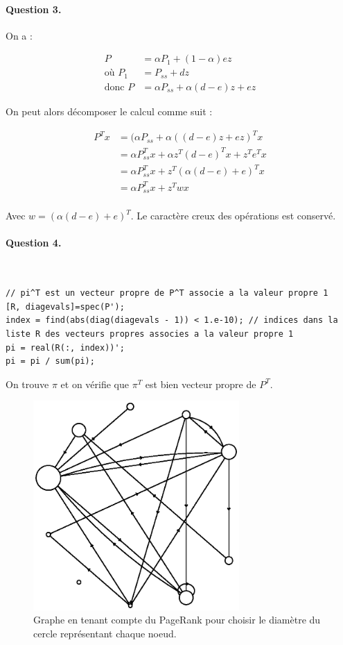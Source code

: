 \documentclass[12pt,a4paper]{article}
\begin{document}
\paragraph*{Question 3.} On a :

\begin{align*}
	P &= \alpha P_1 + (1 - \alpha) e z \\
	\text{o\`u } P_1 &= P_{ss} + dz \\
	\text{donc } P &= \alpha P_{ss} + \alpha (d - e) z + e z
\end{align*}

On peut alors décomposer le calcul comme suit :

\begin{align*}
P^T x
&= (\alpha P_{ss} + \alpha ((d - e) z + ez)^T x \\
&= \alpha P_{ss}^T x + \alpha z^T (d - e)^T x + z^T e^T x \\
&= \alpha P_{ss}^T x + z^T (\alpha (d - e) + e)^T x \\
&= \alpha P_{ss}^T x + z^T w x \\
\end{align*}

Avec $w = (\alpha (d - e) + e)^T$. Le caractère creux des opérations est conservé.

\paragraph*{Question 4.}
~
\begin{lstlisting}
// pi^T est un vecteur propre de P^T associe a la valeur propre 1
[R, diagevals]=spec(P');
index = find(abs(diag(diagevals - 1)) < 1.e-10); // indices dans la liste R des vecteurs propres associes a la valeur propre 1
pi = real(R(:, index))';
pi = pi / sum(pi);
\end{lstlisting}

On trouve $\pi$ et on vérifie que $\pi^T$ est bien vecteur propre de $P^T$.

\begin{figure}[H]
    \centering
    \includegraphics[width=0.7\textwidth]{q4.eps}
    \caption{Graphe en tenant compte du PageRank pour choisir le diamètre du cercle représentant chaque noeud.}
\end{figure}
\end{document}
